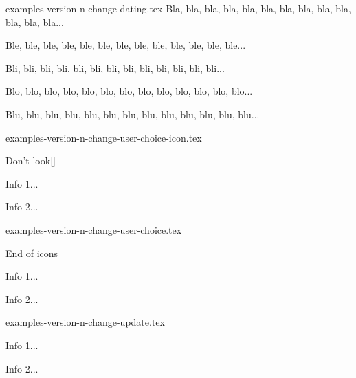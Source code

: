

\begin{filecontents*}[overwrite]{examples-version-n-change-dating.tex}
Bla, bla, bla, bla, bla, bla, bla, bla, bla, bla, bla, bla, bla...

\medskip %


Ble, ble, ble, ble, ble, ble, ble, ble, ble, ble, ble, ble, ble...

\medskip %


Bli, bli, bli, bli, bli, bli, bli, bli, bli, bli, bli, bli, bli...

Blo, blo, blo, blo, blo, blo, blo, blo, blo, blo, blo, blo, blo...

Blu, blu, blu, blu, blu, blu, blu, blu, blu, blu, blu, blu, blu...
\end{filecontents*}


\begin{filecontents*}[overwrite]{examples-version-n-change-user-choice-icon.tex}
\begin{tdoctopic}{Don't look}[\faEyeSlash]
    \item Info 1...
    \item Info 2...
\end{tdoctopic}
\end{filecontents*}


\begin{filecontents*}[overwrite]{examples-version-n-change-user-choice.tex}
\begin{tdoctopic}{End of icons}
    \item Info 1...
    \item Info 2...
\end{tdoctopic}
\end{filecontents*}


\begin{filecontents*}[overwrite]{examples-version-n-change-update.tex}
\begin{tdocupdate}
    \item Info 1...
    \item Info 2...
\end{tdocupdate}
\end{filecontents*}



